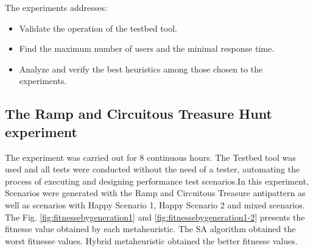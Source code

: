 \documentclass[times]{stvrauth}
\begin{document}
The experiments addresses:

\begin{itemize}
\item Validate the operation of the testbed tool.
\item Find the maximum number of users and the minimal response time.
\item Analyze and verify the best heuristics among those chosen to the experiments.
\end{itemize}


\subsection{The Ramp and Circuitous Treasure Hunt experiment}

The experiment was carried out for 8 continuous hours. The Testbed tool was used and all tests were conducted without the need of a tester, automating the process of executing and designing performance test scenarios.In this experiment, Scenarios were generated with the Ramp and Circuitous Treasure antipattern as well as scenarios with Happy Scenario 1, Happy Scenario 2 and mixed scenarios. The Fig. \ref{fig:fitnessebygeneration1} and \ref{fig:fitnessebygeneration1-2} presents the fitnesse value obtained by each metaheuristic. The SA algorithm obtained the worst fitnesse values. Hybrid metaheuristic obtained the better fitnesse values. 
\end{document}

